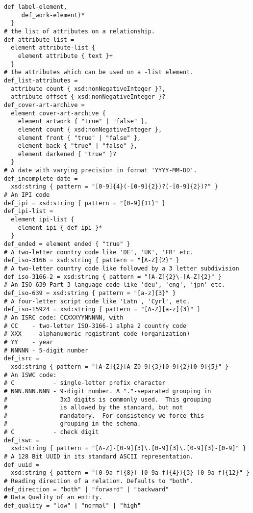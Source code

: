 \begin{Verbatim}[fontsize=\relsize{-2},frame=lines,framesep=.25in,label={[Schema Start]Schema End}]
     def_label-element,
     def_work-element)*
  }
# the list of attributes on a relationship.
def_attribute-list =
  element attribute-list {
    element attribute { text }+
  }
# the attributes which can be used on a -list element.
def_list-attributes =
  attribute count { xsd:nonNegativeInteger }?,
  attribute offset { xsd:nonNegativeInteger }?
def_cover-art-archive =
  element cover-art-archive {
    element artwork { "true" | "false" },
    element count { xsd:nonNegativeInteger },
    element front { "true" | "false" },
    element back { "true" | "false" },
    element darkened { "true" }?
  }
# A date with varying precision in format 'YYYY-MM-DD'.
def_incomplete-date =
  xsd:string { pattern = "[0-9]{4}(-[0-9]{2})?(-[0-9]{2})?" }
# An IPI code
def_ipi = xsd:string { pattern = "[0-9]{11}" }
def_ipi-list =
  element ipi-list {
    element ipi { def_ipi }*
  }
def_ended = element ended { "true" }
# A two-letter country code like 'DE', 'UK', 'FR' etc.
def_iso-3166 = xsd:string { pattern = "[A-Z]{2}" }
# A two-letter country code like followed by a 3 letter subdivision
def_iso-3166-2 = xsd:string { pattern = "[A-Z]{2}\-[A-Z]{2}" }
# An ISO-639 Part 3 language code like 'deu', 'eng', 'jpn' etc.
def_iso-639 = xsd:string { pattern = "[a-z]{3}" }
# A four-letter script code like 'Latn', 'Cyrl', etc.
def_iso-15924 = xsd:string { pattern = "[A-Z][a-z]{3}" }
# An ISRC code: CCXXXYYNNNNN, with
# CC    - two-letter ISO-3166-1 alpha 2 country code
# XXX   - alphanumeric registrant code (organization)
# YY    - year
# NNNNN - 5-digit number
def_isrc =
  xsd:string { pattern = "[A-Z]{2}[A-Z0-9]{3}[0-9]{2}[0-9]{5}" }
# An ISWC code: 
# C           - single-letter prefix character
# NNN.NNN.NNN - 9-digit number. A "."-separated grouping in
#               3x3 digits is commonly used.  This grouping
#               is allowed by the standard, but not
#               mandatory.  For consistency we force this
#               grouping in the schema.
# C           - check digit
def_iswc =
  xsd:string { pattern = "[A-Z]-[0-9]{3}\.[0-9]{3}\.[0-9]{3}-[0-9]" }
# A 128 Bit UUID in its standard ASCII representation.
def_uuid =
  xsd:string { pattern = "[0-9a-f]{8}(-[0-9a-f]{4}){3}-[0-9a-f]{12}" }
# Reading direction of a relation. Defaults to "both".
def_direction = "both" | "forward" | "backward"
# Data Quality of an entity.
def_quality = "low" | "normal" | "high"
\end{Verbatim}
